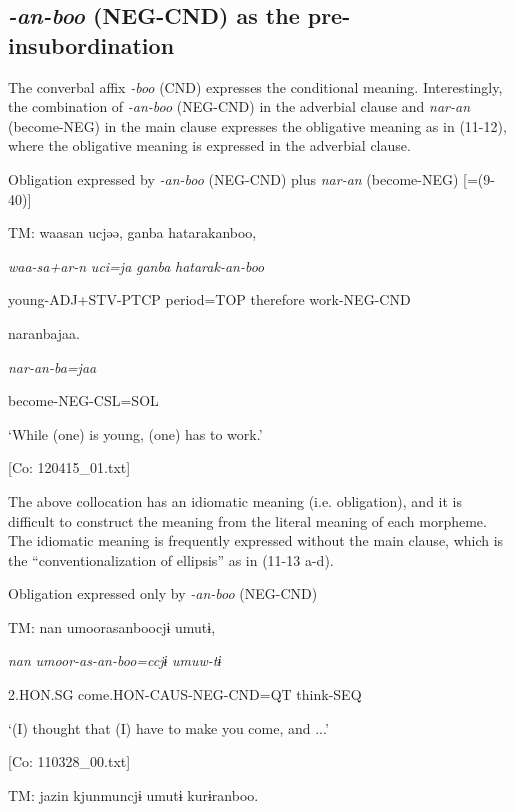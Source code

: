 \subsection{\textit{{}-an-boo} (NEG-CND) as the pre-insubordination}\label{sec:11.2.4}

The converbal affix \textit{{}-boo} (CND) expresses the conditional meaning. Interestingly, the combination of \textit{{}-an-boo} (NEG-CND) in the adverbial clause and \textit{nar-an} (become-NEG) in the main clause expresses the obligative meaning as in (11-12), where the obligative meaning is expressed in the adverbial clause.

\ea\label{ex:11-12}  Obligation expressed by \textit{{}-an-boo} (NEG-CND) plus \textit{nar-an} (become-NEG) [=(9-40)]

  TM:  waasan  ucjəə,  ganba  hatarakanboo,

    \textit{waa-sa+ar-n}  \textit{uci=ja}  \textit{ganba}  \textit{hatarak-an-boo}

    young-ADJ+STV-PTCP  period=TOP  therefore  work-NEG-CND

    naranbajaa.

    \textit{nar-an{}-ba=jaa}

    become-NEG-CSL=SOL

    ‘While (one) is young, (one) has to work.’

    [Co: 120415\_01.txt]
\z

The above collocation has an idiomatic meaning (i.e. obligation), and it is difficult to construct the meaning from the literal meaning of each morpheme. The idiomatic meaning is frequently expressed without the main clause, which is the “conventionalization of ellipsis” \citep[372-373]{Evans2007} as in (11-13 a-d).

\ea\label{ex:11-13}  Obligation expressed only by \textit{{}-an-boo} (NEG-CND)

  \ea\relax  [= (8-122 b)]

    TM:  nan  umoorasanboocjɨ  umutɨ,

      \textit{nan}  \textit{umoor-as-an-boo=ccjɨ}  \textit{umuw-tɨ}

      2.HON.SG  come.HON-CAUS-NEG-CND=QT  think-SEQ

      ‘(I) thought that (I) have to make you come, and ...’

      [Co: 110328\_00.txt]

  \ex\relax[= (10-33)]

    TM:  jazin  kjunmuncjɨ  umutɨ  kurɨranboo.

